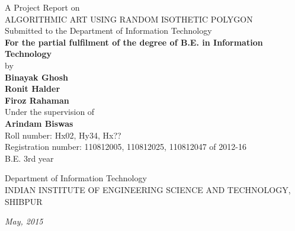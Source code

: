 \documentclass[12pt]{article}
\begin{document}
\begin{titlepage}
\thispagestyle{empty}
{\centering
{\large A Project Report on}\\
\vspace{0.5cm}
\large
{\Huge ALGORITHMIC ART USING RANDOM ISOTHETIC POLYGON}\\
\vspace{0.5cm}
Submitted to the Department of Information Technology\\
\vspace{1cm}
{\Large\bf For the partial fulfilment of the degree of B.E. in Information Technology}\\
\vspace{1cm}
by \\
\vspace{.5cm}
\hspace{.05cm} {\large \bf{Binayak Ghosh}}\\
\hspace{.05cm} {\large \bf{Ronit Halder}}\\
\hspace{.05cm} {\large \bf{Firoz Rahaman}}\\
\vspace {0.3cm}
\hspace{.05cm} Under the supervision of\\
\hspace{.05cm} {\large \bf{Arindam Biswas}}\\
\vspace {0.8cm}
Roll number: Hx02, Hy34, Hx??\\
Registration number: 110812005, 110812025, 110812047 of 2012-16\\
B.E. 3rd year\\
\vspace*{0.7cm}
\begin{figure}[h]
{\par}
\end{figure}
Department of Information Technology\\
INDIAN INSTITUTE OF ENGINEERING SCIENCE AND TECHNOLOGY, SHIBPUR\\
\begin{center}
\textit{May, 2015}
\end{center}

{\centering
\hspace{6.5cm} \date{\today}}
}
\pagebreak
\end{titlepage}
\end{document}
